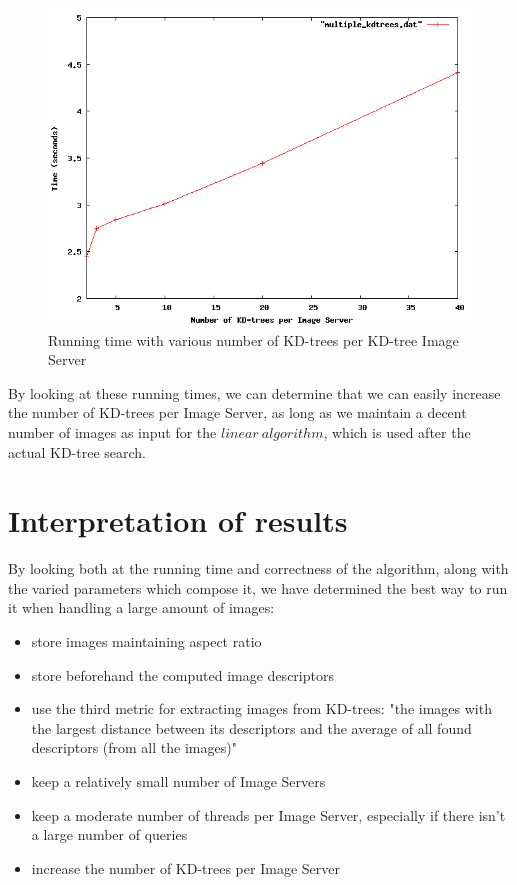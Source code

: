 \begin{figure}[H]
\centering
\includegraphics[width=.8\linewidth]{images/multipleKDTrees.png}
\caption{Running time with various number of KD-trees per KD-tree Image Server}
\label{fig:multipleKDTrees}
\end{figure}

By looking at these running times, we can determine that we can easily increase the number of KD-trees per Image Server, as long as we maintain a decent number of images as input for the $linear\ algorithm$, which is used after the actual KD-tree search.\\

\section{Interpretation of results}

By looking both at the running time and correctness of the algorithm, along with the varied parameters which compose it, we have determined the best way to run it when handling a large amount of images:
\begin{itemize}
	\item store images maintaining aspect ratio
	\item store beforehand the computed image descriptors
	\item use the third metric for extracting images from KD-trees: "the images with the largest distance between its descriptors and the average of all found descriptors (from all the images)"
	\item keep a relatively small number of Image Servers
	\item keep a moderate number of threads per Image Server, especially if there isn't a large number of queries
	\item increase the number of KD-trees per Image Server
\end{itemize}
